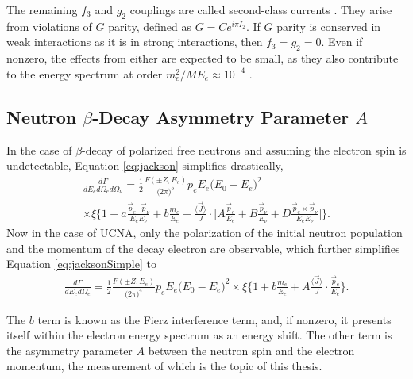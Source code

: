 The remaining $f_3$ and $g_2$ couplings are called second-class currents \cite{weinberg1958charge}.
They arise from violations of $G$ parity, defined as $G = Ce^{i\pi I_2}$. If $G$ parity is conserved in
weak interactions as it is in strong interactions, then $f_3=g_2=0$. Even if nonzero, the effects
from either are expected to be small, as they also contribute to the energy spectrum at order $m_e^2/ME_e \approx 10^{-4}$
\cite{holstein1974recoil,plaster2012}.


\subsection{Neutron $\beta$-Decay Asymmetry Parameter $A$} \label{ssec:neutronAsymmParam}

In the case of $\beta$-decay of polarized free neutrons and assuming the electron spin is undetectable,
Equation \ref{eq:jackson} simplifies drastically,
%
\begin{multline}
  \frac{d\Gamma}{dE_e d\Omega_e d\Omega_\nu} = \frac{1}{2} \frac{F(\pm Z, E_e)}{\big( 2\pi \big)^5}
  p_e E_e \big( E_0 - E_e \big)^2 \\ \times \xi 
  \Bigg\{ 1 + a\frac{\vec{p}_e \cdot \vec{p}_\nu}{E_e E_\nu} + b\frac{m_e}{E_e} 
  + \frac{\langle \vec{J} \rangle}{J} \cdot \Bigg[ A\frac{\vec{p}_e}{E_e}
    + B\frac{\vec{p}_\nu}{E_\nu} + D\frac{\vec{p}_e \times \vec{p}_\nu}{E_e E_\nu}\Bigg]
  \Bigg\}.
  \label{eq:jacksonSimple}
\end{multline}
%
Now in the case of UCNA, only the polarization of the initial neutron population and the momentum
of the decay electron are observable, which further simplifies Equation \ref{eq:jacksonSimple} to
%
\begin{multline}
  \frac{d\Gamma}{dE_e d\Omega_e} = \frac{1}{2} \frac{F(\pm Z, E_e)}{\big( 2\pi \big)^4}
  p_e E_e \big( E_0 - E_e \big)^2 \times \xi 
  \Bigg\{ 1 + b\frac{m_e}{E_e} 
  + A \frac{\langle \vec{J} \rangle}{J} \cdot \frac{\vec{p}_e}{E_e}
  \Bigg\}.
  \label{eq:jacksonSimple2}
\end{multline}
%

The $b$ term is known as the Fierz interference term, and, if nonzero, it presents itself
within the electron energy spectrum as an energy shift. The other term is the asymmetry parameter
$A$ between the neutron spin and the electron momentum, the measurement of which is the topic of
this thesis.

